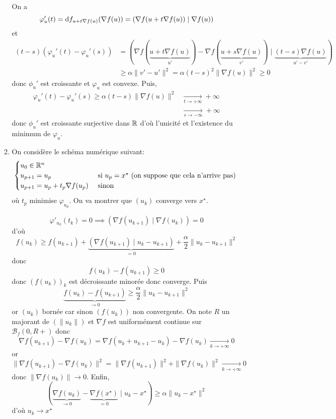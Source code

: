 \begin{enumerate}
\begin{enumerate}
                On a \[
                    \varphi_u'(t)=\mathrm{d} f_{u+t\nabla f(u)}(\nabla f(u))=(\nabla f(u+t\nabla f(u))\;|\;\nabla f(u))
                \]
                et \begin{align*}
                    (t-s)(\varphi_u'(t)-\varphi_u'(s))&=(\nabla f(\underbrace{u+t\nabla f(u)}_{u'})-\nabla f(\underbrace{u+s\nabla f(u)}_{v'})\;|\;\underbrace{(t-s)\nabla f(u)}_{u'-v'}) \\
                                                      &\geq \alpha\|v'-u'\|^2=\alpha(t-s)^2\|\nabla f(u)\|^2\geq 0
                \end{align*}
                donc $\phi_u'$ est croissante et $\varphi_u$ est convexe. Puis, \begin{align*}
                    \varphi_u'(t)-\varphi_u'(s)\geq \alpha(t-s)\|\nabla f(u)\|^2 &\xrightarrow[t\to+\infty]{} +\infty \\ &\xrightarrow[s\to-\infty]{}+\infty
                \end{align*}
                donc $\phi_u'$ est croissante surjective dans $\mathbb R$ d'où l'unicité et l'existence du minimum de $\varphi_u$.
            \item On considère le schéma numérique suivant: \[
                    \begin{cases}
                        u_0\in\mathbb R^n\\
                        u_{p+1}=u_p &\text{ si }u_p=x^\star \text{ (on suppose que cela n'arrive pas) }\\
                        u_{p+1}=u_p+t_p\nabla f(u_p) &\text{ sinon }
                    \end{cases}
                \]
                où $t_p$ minimise $\varphi_{u_p}$. On va montrer que $(u_k)$ converge vers $x^\star$.

                \[
                    \varphi'_{u_k}(t_k)=0\implies (\nabla f(u_{k+1})\;|\;\nabla f(u_k))=0
                \]
                d'où \[
                    f(u_k)\geq f(u_{k+1})+\underbrace{(\nabla f(u_{k+1})\;|\; u_k-u_{k+1})}_{=0}+\frac\alpha2\|u_k-u_{k+1}\|^2
                \]
                donc \[
                    f(u_k)-f(u_{k+1})\geq 0
                \]
                donc $(f(u_k))_k$ est décroissante minorée donc converge. Puis \[
                    \underbrace{f(u_k)-f(u_{k+1})}_{\longrightarrow 0}\geq \frac\alpha2\|u_k-u_{k+1}\|^2
                \]
                or $(u_k)$ bornée car sinon $(f(u_k))$ non convergente. On note $R$ un majorant de $(\|u_k\|)$ et $\nabla f$ est uniformément continue sur $\mathcal B_f (0, R+)$ donc \[
                    \nabla f(u_{k+1})-\nabla f(u_k)=\nabla f(u_k+u_{k+1}-u_k)-\nabla f(u_k) \xrightarrow[k\to+\infty ]{} 0
                \]
                or \[
                    \|\nabla f(u_{k+1})-\nabla f(u_k)\|^2=\|\nabla f(u_{k+1})\|^2+\|\nabla f(u_k)\|^2\xrightarrow[k\to+\infty]{}0
                \]
                donc $\|\nabla f(u_k)\|\to 0$. Enfin, \[
                    (\underbrace{\nabla f(u_k)}_{\to 0}-\underbrace{\nabla f(x^\star)}_{=0}\;|\;u_k-x^\star)\geq \alpha\|u_k-x^\star\| ^2
                \] d'où $u_k\to x^\star$
        \end{enumerate}
\end{enumerate}
\endchapter
